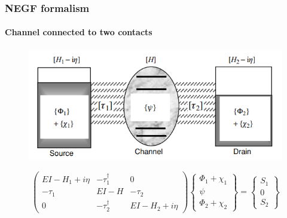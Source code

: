 \documentclass{beamer}
\begin{document}
{

    \begin{frame}

        \frametitle{NEGF formalism}
        \framesubtitle{Channel connected to two contacts}
        \scriptsize

\vspace{12pt}

\begin{figure}[!htbp]
\centering
\includegraphics[scale=0.3]{two_contacts.png}
\end{figure}

\begin{equation*}
\begin{pmatrix}
    EI-H_{1}+i\eta & -\tau_{1}^{\dagger} & 0 \\
    -\tau_{1} & EI-H & -\tau_{2} \\
    0 & -\tau_{2}^{\dagger} & EI-H_{2}+i\eta
\end{pmatrix} 
\begin{Bmatrix}
    \Phi_{1}+\chi_{1} \\
    \psi \\
    \Phi_{2}+\chi_{2} 
\end{Bmatrix} =
\begin{Bmatrix}
    S_{1} \\ 
    0 \\
    S_{2}
\end{Bmatrix}
\end{equation*}


\end{frame}}
\end{document}
